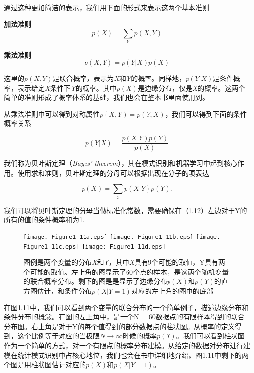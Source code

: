	通过这种更加简洁的表示，我们用下面的形式来表示这两个基本准则
	
	{\color{red}{概率的准则}}
	
	\textbf{加法准则}
			\begin{equation}
			 p(X) = \sum_Y p(X,Y)
			\end{equation}
	
	\textbf{乘法准则}
			\begin{equation}
			 p(X,Y) = p(Y|X)p(X)
			\end{equation} 

	这里的$p(X, Y)$是联合概率，表示为\textit{X}和\textit{Y}的概率。同样地，$p(Y|X)$是条件概率，表示给定\textit{X}条件下\textit{Y}的概率。其中$p(X)$是边缘分布，仅是\textit{X}的概率。这两个简单的准则形成了概率体系的基础，我们也会在整本书里面使用到。
	
	从乘法准则中可以得到对称属性$p(X, Y) = p(Y, X)$，我们可以得到下面的条件概率关系
	
	\begin{equation}
	p(Y|X) = \frac{p(X|Y)p(Y)}{p(X)}
	\end{equation}
	
	我们称为贝叶斯定理（\textit{Bayes' theorem}），其在模式识别和机器学习中起到核心作用。使用求和准则，贝叶斯定理的分母可以根据出现在分子的项表达
	
	\begin{equation}
	p(X) = \sum_Y p(X|Y)p(Y).
	\end{equation}
	
	我们可以将贝叶斯定理的分母当做标准化常数，需要确保在（1.12）左边对于Y的所有的值的条件概率和为1.
	
	\begin{figure}[t]
		\texttt{[image: Figure1-11a.eps]}
		\texttt{[image: Figure1-11b.eps]}
		\texttt{[image: Figure1-11c.eps]}
		\texttt{[image: Figure1-11d.eps]}
		\caption{图例是两个变量的分布\textit{X}和\textit{Y}，其中\textit{X}具有9个可能的取值，Y具有两个可能的取值。左上角的图显示了60个点的样本，是这两个随机变量的联合概率分布。剩下的图是是显示了边缘分布$p(X)$和$p(Y)$的直方图估计，和条件分布$p(X|Y = 1)$对应的左上角的图中的底部}
	\end{figure}
	
	在图1.11中，我们可以看到两个变量的联合分布的一个简单例子，描述边缘分布和条件分布的概念。在图的左上角中，是一个N = 60数据点的有限样本得到的联合分布图。右上角是对于Y的每个值得到的部分数据点的柱状图。从概率的定义得到，这个比例等于对应的当极限$N \to \infty$时候的概率$p(Y)$。我们可以看到柱状图作为一个简单的方式，对一个有限点的概率分布建模。从给定的数据对分布进行建模在统计模式识别中占核心地位，我们也会在书中详细地介绍。图1.11中剩下的两个图是用柱状图估计对应的$p(X)$和$p(X|Y = 1)$。
	
